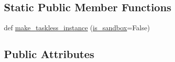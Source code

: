 \subsection*{Static Public Member Functions}
\begin{DoxyCompactItemize}
\item 
def \hyperlink{classparlai_1_1mturk_1_1core_1_1dev_1_1mturk__manager_1_1MTurkManager_ae84743e201356fa7c943433493210818}{make\+\_\+taskless\+\_\+instance} (\hyperlink{classparlai_1_1mturk_1_1core_1_1dev_1_1mturk__manager_1_1MTurkManager_a08ceadab4df94bd28629a16503cd0418}{is\+\_\+sandbox}=False)
\end{DoxyCompactItemize}
\subsection*{Public Attributes}
